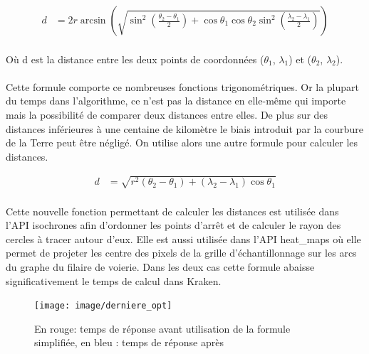 \documentclass[a4paper]{report}
\begin{document}
\begin{align}
	d &= 2r\arcsin\left(\sqrt{\sin^2\left(\frac{\theta_{2} - \theta_{1}}{2}\right)+\cos\theta_{1}\cos\theta_{2}\sin^2\left(\frac{\lambda_{2} - \lambda_{1}}{2}\right)}\right)
\end{align}

\paragraph{} Où d est la distance entre les deux points de coordonnées ($\theta_{1}$, $\lambda_{1}$) et ($\theta_{2}$, $\lambda_{2}$).

\paragraph{} Cette formule comporte ce nombreuses fonctions trigonométriques. Or la plupart du temps dans l'algorithme, ce n'est pas la distance en elle-même qui importe mais la possibilité de comparer deux distances entre elles. De plus sur des distances inférieures à une centaine de kilomètre le biais introduit par la courbure de la Terre peut être négligé. On utilise alors une autre formule pour calculer les distances.

\begin{align}
	d &= \sqrt{r^2\left(\theta_{2} - \theta_{1}\right)+\left(\lambda_{2} - \lambda_{1}\right)\cos\theta_{1}}
\end{align}

\paragraph{} Cette nouvelle fonction permettant de calculer les distances est utilisée dans l'API isochrones afin d'ordonner les points d'arrêt et de calculer le rayon des cercles à tracer autour d'eux. Elle est aussi utilisée dans l'API heat\_maps où elle permet de projeter les centre des pixels de la grille d'échantillonnage sur les arcs du graphe du filaire de voierie. Dans les deux cas cette formule abaisse significativement le temps de calcul dans Kraken. 

\begin{figure}[H]
	\begin{center}
		\texttt{[image: image/derniere\_opt]}
		\caption{En rouge: temps de réponse avant utilisation de la formule simplifiée, en bleu : temps de réponse après}
		\label{Temps de réponse après utilisation de la formule simplifiée}
	\end{center}
\end{figure}
\end{document}
